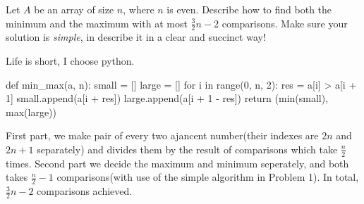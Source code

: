 \documentclass[11pt,a4paper,oneside]{article}
\begin{document}
\begin{problem}{2}
	\statement
	Let $A$ be an array of size $n$, where $n$ is even. 
	Describe how to find both the minimum and the maximum
	with at most $\frac{3}{2} n  - 2$ comparisons.
	Make sure your solution is {\em simple}, in describe it 
	in a clear and succinct way!

	\solution
	Life is short, I choose python.
\begin{python}
def min_max(a, n):
    small = []
    large = []
    for i in range(0, n, 2):
        res = a[i] > a[i + 1]
        small.append(a[i + res])
        large.append(a[i + 1 - res])
    return (min(small), max(large))
\end{python}
	First part, we make pair of every two ajancent number(their indexes are \(2n\) and \(2n + 1\) separately) and divides them by the result of comparisons which take $\frac n 2$ times.
	Second part we decide the maximum and minimum seperately, and both takes $\frac n 2 - 1$ comparisons(with use of the simple algorithm in Problem 1). In total, $\frac {3} {2} n - 2$ comparisons achieved.
\end{problem}
\end{document}
